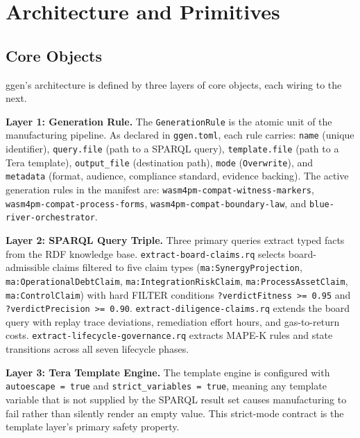 
\section{Architecture and Primitives}
\label{sec:ggen-architecture}

\subsection{Core Objects}
\label{sec:ggen-architecture-objects}

ggen's architecture is defined by three layers of core objects, each wiring to the next.

\textbf{Layer 1: Generation Rule.} The \texttt{GenerationRule} is the atomic unit of the
manufacturing pipeline. As declared in \texttt{ggen.toml}, each rule carries:
\texttt{name} (unique identifier), \texttt{query.file} (path to a SPARQL query),
\texttt{template.file} (path to a Tera template), \texttt{output\_file} (destination path),
\texttt{mode} (\texttt{Overwrite}), and \texttt{metadata} (format, audience, compliance
standard, evidence backing). The active generation rules in the manifest are:
\texttt{wasm4pm-compat-witness-markers}, \texttt{wasm4pm-compat-process-forms},
\texttt{wasm4pm-compat-boundary-law}, and \texttt{blue-river-orchestrator}.

\textbf{Layer 2: SPARQL Query Triple.} Three primary queries extract typed facts from the RDF
knowledge base. \texttt{extract-board-claims.rq} selects board-admissible claims filtered to five
claim types (\texttt{ma:SynergyProjection}, \texttt{ma:OperationalDebtClaim},
\texttt{ma:IntegrationRiskClaim}, \texttt{ma:ProcessAssetClaim}, \texttt{ma:ControlClaim}) with
hard FILTER conditions \texttt{?verdictFitness >= 0.95} and \texttt{?verdictPrecision >= 0.90}.
\texttt{extract-diligence-claims.rq} extends the board query with replay trace deviations,
remediation effort hours, and gas-to-return costs. \texttt{extract-lifecycle-governance.rq}
extracts MAPE-K rules and state transitions across all seven lifecycle phases.

\textbf{Layer 3: Tera Template Engine.} The template engine is configured with
\texttt{autoescape = true} and \texttt{strict\_variables = true}, meaning any template variable
that is not supplied by the SPARQL result set causes manufacturing to fail rather than silently
render an empty value. This strict-mode contract is the template layer's primary safety property.

